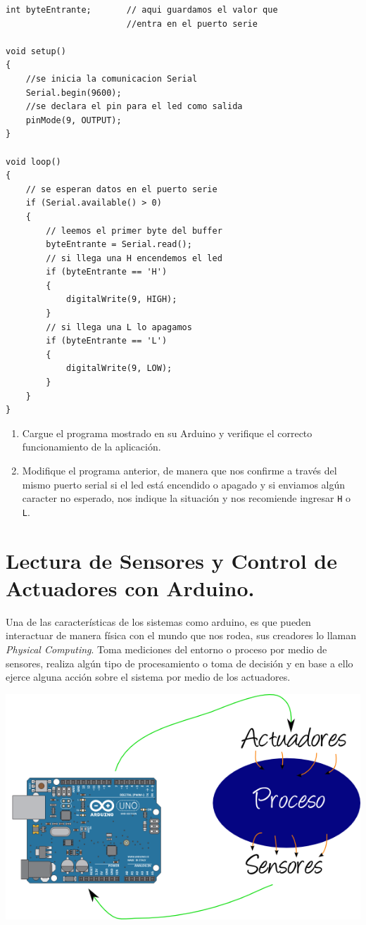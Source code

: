 \documentclass[letterpaper, 10pt]{report}
\begin{document}
\begin{lstlisting}[style=myArduino]
int byteEntrante;      	// aqui guardamos el valor que 
						//entra en el puerto serie

void setup()
{
	//se inicia la comunicacion Serial
    Serial.begin(9600);
    //se declara el pin para el led como salida
    pinMode(9, OUTPUT);
}

void loop()
{
    // se esperan datos en el puerto serie
    if (Serial.available() > 0)
    {
        // leemos el primer byte del buffer
        byteEntrante = Serial.read();
        // si llega una H encendemos el led
        if (byteEntrante == 'H')
        {
            digitalWrite(9, HIGH);
        }
        // si llega una L lo apagamos
        if (byteEntrante == 'L')
        {
            digitalWrite(9, LOW);
        }
    }
}
\end{lstlisting} 

\begin{enumerate}
\item Cargue el programa mostrado en su Arduino y verifique el correcto funcionamiento de la aplicación.

\item Modifique el programa anterior, de manera que nos confirme a través del mismo puerto serial si el led está encendido o apagado y si enviamos algún caracter no esperado, nos indique la situación y nos recomiende ingresar \texttt{H} o \texttt{L}.
\end{enumerate}
\chapter{Lectura de Sensores y Control de Actuadores con Arduino.}

Una de las características de los sistemas como arduino, es que pueden interactuar de manera física con el mundo que nos rodea, sus creadores lo llaman \emph{Physical Computing}. Toma mediciones del entorno o proceso por medio de sensores, realiza algún tipo de procesamiento o toma de decisión y en base a ello ejerce alguna acción sobre el sistema por medio de los actuadores.

\begin{center}
\includegraphics[scale=0.7]{proceso.png}
\end{center} 
\end{document}
